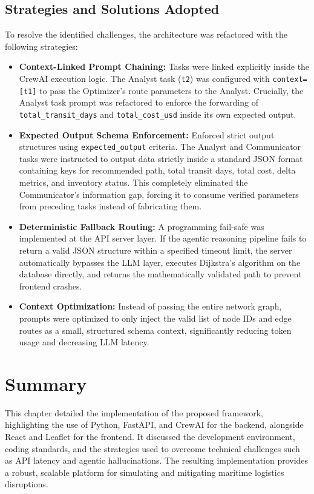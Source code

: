 \subsection[Strategies and Solutions Adopted]{Strategies and Solutions Adopted}
To resolve the identified challenges, the architecture was refactored with the following strategies:

\begin{itemize}
    \item \textbf{Context-Linked Prompt Chaining:}
    Tasks were linked explicitly inside the CrewAI execution logic. The Analyst task (\texttt{t2}) was configured with \texttt{context=[t1]} to pass the Optimizer's route parameters to the Analyst. Crucially, the Analyst task prompt was refactored to enforce the forwarding of \texttt{total\_transit\_days} and \texttt{total\_cost\_usd} inside its own expected output.

    \item \textbf{Expected Output Schema Enforcement:}
    Enforced strict output structures using \texttt{expected\_output} criteria. The Analyst and Communicator tasks were instructed to output data strictly inside a standard JSON format containing keys for recommended path, total transit days, total cost, delta metrics, and inventory status. This completely eliminated the Communicator's information gap, forcing it to consume verified parameters from preceding tasks instead of fabricating them.

    \item \textbf{Deterministic Fallback Routing:}
    A programming fail-safe was implemented at the API server layer. If the agentic reasoning pipeline fails to return a valid JSON structure within a specified timeout limit, the server automatically bypasses the LLM layer, executes Dijkstra's algorithm on the database directly, and returns the mathematically validated path to prevent frontend crashes.

    \item \textbf{Context Optimization:}
    Instead of passing the entire network graph, prompts were optimized to only inject the valid list of node IDs and edge routes as a small, structured schema context, significantly reducing token usage and decreasing LLM latency.
\end{itemize}
\section[Summary]{Summary}
This chapter detailed the implementation of the proposed framework, highlighting the use of Python, FastAPI, and CrewAI for the backend, alongside React and Leaflet for the frontend. It discussed the development environment, coding standards, and the strategies used to overcome technical challenges such as API latency and agentic hallucinations. The resulting implementation provides a robust, scalable platform for simulating and mitigating maritime logistics disruptions.










